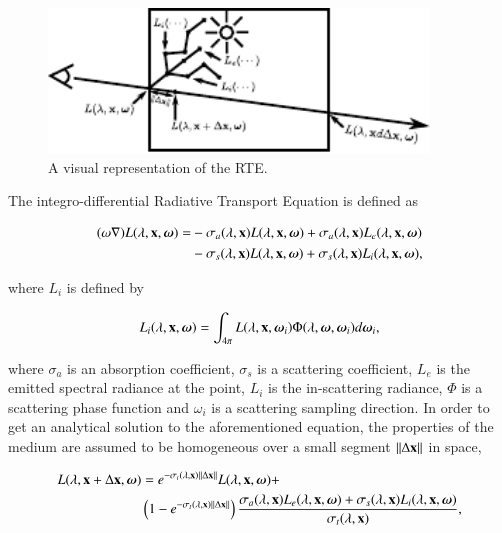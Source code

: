 \begin{figure}[htbp!]
	\centering
	\includegraphics[width=0.9\textwidth]{img/ray_marching_parti}
	\caption{A visual representation of the RTE.}
	\label{fig:ray_marching_parti}
\end{figure}

The integro-differential Radiative Transport Equation is defined as

\begin{equation}
\begin{split}
(\omega \nabla) L(\lambda, \mathbf{x}, \boldsymbol{\omega}) = &- \sigma_a(\lambda, \mathbf{x}) L(\lambda, \mathbf{x}, \boldsymbol{\omega}) + \sigma_a(\lambda, \mathbf{x}) L_e(\lambda, \mathbf{x}, \boldsymbol{\omega}) \\
&- \sigma_s(\lambda, \mathbf{x}) L(\lambda, \mathbf{x}, \boldsymbol{\omega}) + \sigma_s(\lambda, \mathbf{x}) L_i(\lambda, \mathbf{x}, \boldsymbol{\omega}),
\end{split}
\end{equation}

where $L_i$ is defined by

\begin{equation}
\label{eq:li}
L_i(\lambda, \mathbf{x}, \boldsymbol{\omega}) = \int_{4 \pi} L(\lambda, \mathbf{x}, \boldsymbol{\omega}_i) \Phi (\lambda, \boldsymbol{\omega}, \boldsymbol{\omega}_i) d \boldsymbol{\omega}_i,
\end{equation}

where $\sigma_a$ is an absorption coefficient, $\sigma_s$ is a scattering coefficient, $L_e$ is the emitted spectral radiance at the point, $L_i$ is the in-scattering radiance, $\Phi$ is a scattering phase function and $\omega_i$ is a scattering sampling direction.
In order to get an analytical solution to the aforementioned equation, the properties of the medium are assumed to be homogeneous over a small segment $\left \| \Delta \mathbf{x} \right \|$ in space,

\begin{equation}
\label{eq:rte_solution_paper}
\begin{split}
L(\lambda, \mathbf{x} + \Delta\mathbf{x}, \boldsymbol{\omega}) &= e^{-\sigma_t(\lambda, \mathbf{x}) \left \| \Delta \mathbf{x} \right \|} L(\lambda, \mathbf{x}, \boldsymbol{\omega}) +  \\
& \left(1 - e^{-\sigma_t(\lambda, \mathbf{x}) \left \| \Delta \mathbf{x} \right \|} \right) \frac{\sigma_a(\lambda, \mathbf{x}) L_e(\lambda, \mathbf{x}, \boldsymbol{\omega}) + \sigma_s(\lambda, \mathbf{x}) L_i(\lambda, \mathbf{x}, \boldsymbol{\omega})}{\sigma_t(\lambda, \mathbf{x})},
\end{split}
\end{equation}

